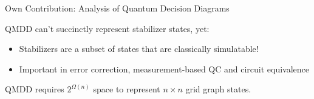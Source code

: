 








\begin{refframe}{\alert{Own Contribution:} Analysis of Quantum Decision Diagrams}

\begin{alertblock}{QMDD can't succinctly represent stabilizer states, yet:}
	\begin{itemize}
		\item Stabilizers are a subset of states that are \alert{classically simulatable!}
		\item Important in error correction, measurement-based QC and circuit equivalence
	\end{itemize}
\end{alertblock}


\begin{theorem}
QMDD requires $2^{\Omega({{n}})}$ space to represent 
	$ n\times  n$ grid graph states.
\end{theorem}



\end{refframe}
